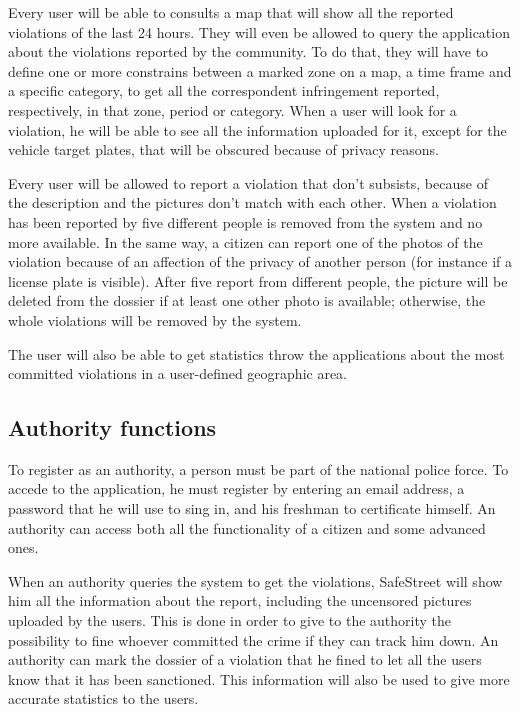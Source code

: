\documentclass[../RASD.tex]{subfiles}
\begin{document}
    Every user will be able to consults a map that will show all the reported violations of the last 24 hours. They will even be allowed to query the application about the violations reported by the community. To do that, they will have to define one or more constrains between a marked zone on a map, a time frame and a specific category, to get all the correspondent infringement reported, respectively, in that zone, period or category. When a user will look for a violation, he will be able to see all the information uploaded for it, except for the vehicle target plates, that will be obscured because of privacy reasons.

    Every user will be allowed to report a violation that don’t subsists, because of the description and the pictures don’t match with each other. When a violation has been reported by five different people is removed from the system and no more available. In the same way, a citizen can report one of the photos of the violation because of an affection of the privacy of another person (for instance if a license plate is visible). After five report from different people, the picture will be deleted from the dossier if at least one other photo is available; otherwise, the whole violations will be removed by the system.

    The user will also be able to get statistics throw the applications about the most committed violations in a user-defined geographic area.
    \subsection{Authority functions}\label{subsec:authority-functions}
    To register as an authority, a person must be part of the national police force. To accede to the application, he must register by entering an email address, a password that he will use to sing in, and his freshman to certificate himself. An authority can access both all the functionality of a citizen and some advanced ones.

    When an authority queries the system to get the violations, SafeStreet will show him all the information about the report, including the uncensored pictures uploaded by the users. This is done in order to give to the authority the possibility to fine whoever committed the crime if they can track him down. An authority can mark the dossier of a violation that he fined to let all the users know that it has been sanctioned. This information will also be used to give more accurate statistics to the users.
\end{document}
